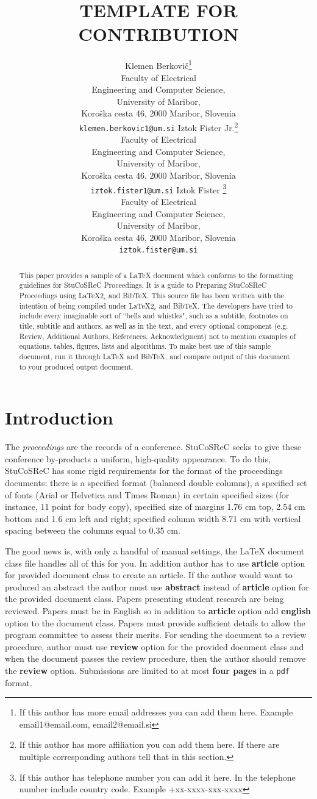 \documentclass[article,english]{stucosrec}
\title{\latex TEMPLATE FOR \stucosrec CONTRIBUTION}
\author{
	Klemen Berkovi\v{c}\thanks{If this author has more email addresses you can add them here. Example email1@email.com, email2@email.si} \\
	Faculty of Electrical \\Engineering and Computer Science,\\
	University of Maribor,\\
	Koro\v{s}ka cesta 46, 2000 Maribor, Slovenia \\
	\texttt{klemen.berkovic1@um.si}
	\And
	Iztok Fister Jr.\thanks{If this author has more affiliation you can add them here. If there are multiple corresponding authors tell that in this section.} \\
	Faculty of Electrical \\Engineering and Computer Science,\\
	University of Maribor,\\
	Koro\v{s}ka cesta 46, 2000 Maribor, Slovenia \\
	\texttt{iztok.fister1@um.si}
	\AND
	Iztok Fister \thanks{If this author has telephone number you can add it here. In the telephone number include country code. Example +xx-xxxx-xxx-xxxx} \\
	Faculty of Electrical \\Engineering and Computer Science,\\
	University of Maribor,\\
	Koro\v{s}ka cesta 46, 2000 Maribor, Slovenia \\
	\texttt{iztok.fister@um.si}
}
\newcommand{\latex}{\LaTeX\xspace}
\newcommand{\bibtex}{Bib\TeX\xspace}
\newcommand{\stucosrec}{StuCoSReC\xspace}
\newcommand{\latexe}{\LaTeX$2_\epsilon$\xspace}
\begin{document}
	
	\maketitle
	
	\begin{abstract}
		This paper provides a sample of a \latex document which conforms to the formatting guidelines for \stucosrec Proceedings.
		It is a guide to Preparing \stucosrec Proceedings using \latexe and \bibtex.
		This source file has been written with the intention of being compiled under \latexe and \bibtex.
		The developers have tried to include every imaginable sort of ``bells and whistles", such as a subtitle, footnotes on title, subtitle and authors, as well as in the text, and every optional component (e.g. Review, Additional Authors, References, Acknowledgment) not to mention examples of equations, tables, figures, lists and algorithms.
		To make best use of this sample document, run it through \latex and \bibtex, and compare output of this document to your produced output document.
	\end{abstract}

	\keywords{\stucosrec Proceedings \and \latex \and text tagging}

	\section{Introduction}
	
	The \textit{proceedings} are the records of a conference.
	\stucosrec seeks to give these conference by-products a uniform, high-quality appearance.
	To do this, \stucosrec has some rigid requirements for the format of the proceedings documents: there is a specified format (balanced  double columns), a specified set of fonts (Arial or Helvetica and Times Roman) in certain specified sizes (for instance, 11 point for body copy), specified size of margins 1.76 cm top, 2.54 cm bottom and 1.6 cm left and right; specified column width 8.71 cm with vertical spacing between the columns equal to 0.35 cm.
	
	The good news is, with only a handful of manual settings, the \latex document class file handles all of this for you.
	In addition author has to use \textbf{article} option for provided document class to create an article.
	If the author would want to produced an abstract the author must use \textbf{abstract} instead of \textbf{article} option for the provided document class.
	Papers presenting student research are being reviewed.
	Papers must be in English so in addition to \textbf{article} option add \textbf{english} option to the document class.
	Papers must provide sufficient details to allow the program committee to assess their merits.
	For sending the document to a review procedure, author must use \textbf{review} option for the provided document class and when the document passes the review procedure, then the author should remove the \textbf{review} option.
	Submissions are limited to at most \textbf{four pages} in a \texttt{pdf} format.
	
\end{document}
